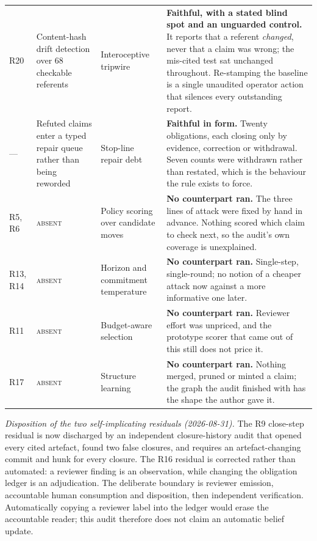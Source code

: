 \begin{table}[t]
\begin{tabular}{p{}p{}p{}p{}}
R20 & Content-hash drift detection over 68 checkable referents & Interoceptive tripwire & \textbf{Faithful, with a stated blind spot and an unguarded control.}  It reports that a referent \emph{changed}, never that a claim was wrong; the mis-cited test sat unchanged throughout.  Re-stamping the baseline is a single unaudited operator action that silences every outstanding report. \\
--- & Refuted claims enter a typed repair queue rather than being reworded & Stop-line repair debt & \textbf{Faithful in form.}  Twenty obligations, each closing only by evidence, correction or withdrawal.  Seven counts were withdrawn rather than restated, which is the behaviour the rule exists to force. \\
\midrule
R5, R6 & \textsc{absent} & Policy scoring over candidate moves & \textbf{No counterpart ran.}  The three lines of attack were fixed by hand in advance.  Nothing scored which claim to check next, so the audit's own coverage is unexplained. \\
R13, R14 & \textsc{absent} & Horizon and commitment temperature & \textbf{No counterpart ran.}  Single-step, single-round; no notion of a cheaper attack now against a more informative one later. \\
R11 & \textsc{absent} & Budget-aware selection & \textbf{No counterpart ran.}  Reviewer effort was unpriced, and the prototype scorer that came out of this still does not price it. \\
R17 & \textsc{absent} & Structure learning & \textbf{No counterpart ran.}  Nothing merged, pruned or minted a claim; the graph the audit finished with has the shape the author gave it. \\
\bottomrule
\end{tabular}
\end{table}

\emph{Disposition of the two self-implicating residuals (2026-08-31).}  The R9 close-step residual is now discharged by an independent closure-history audit that opened every cited artefact, found two false closures, and requires an artefact-changing commit and hunk for every closure.  The R16 residual is corrected rather than automated: a reviewer finding is an observation, while changing the obligation ledger is an adjudication.  The deliberate boundary is reviewer emission, accountable human consumption and disposition, then independent verification.  Automatically copying a reviewer label into the ledger would erase the accountable reader; this audit therefore does not claim an automatic belief update.

